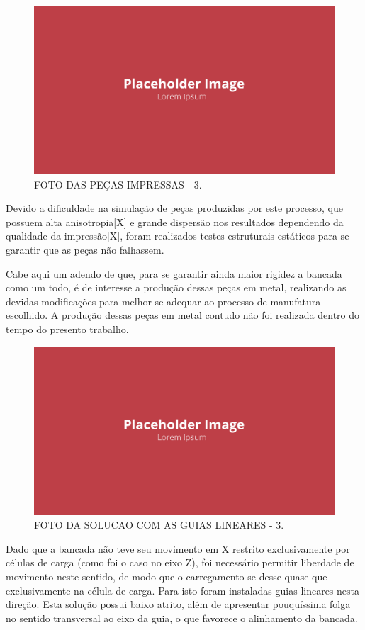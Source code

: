 \begin{figure}[!ht]
    \centering
    \includegraphics[width=.8\linewidth]{figuras/placeholder.png}
    \caption{FOTO DAS PEÇAS IMPRESSAS - 3\cite{autor}.}
    \label{fig:placeholder}
\end{figure}

Devido a dificuldade na simulação de peças produzidas por este processo, que possuem alta anisotropia[X] e grande dispersão nos resultados dependendo da qualidade da impressão[X], foram realizados testes estruturais estáticos para se garantir que as peças não falhassem. 

Cabe aqui um adendo de que, para se garantir ainda maior rigidez a bancada como um todo, é de interesse a produção dessas peças em metal, realizando as devidas modificações para melhor se adequar ao processo de manufatura escolhido. A produção dessas peças em metal contudo não foi realizada dentro do tempo do presento trabalho.

\begin{figure}[!ht]
    \centering
    \includegraphics[width=.8\linewidth]{figuras/placeholder.png}
    \caption{FOTO DA SOLUCAO COM AS GUIAS LINEARES - 3\cite{autor}.}
    \label{fig:placeholder}
\end{figure}

Dado que a bancada não teve seu movimento em X restrito exclusivamente por células de carga (como foi o caso no eixo Z), foi necessário permitir liberdade de movimento neste sentido, de modo que o carregamento se desse quase que exclusivamente na célula de carga. Para isto foram instaladas guias lineares nesta direção. Esta solução possui baixo atrito, além de apresentar pouquíssima folga no sentido transversal ao eixo da guia, o que favorece o alinhamento da bancada.

